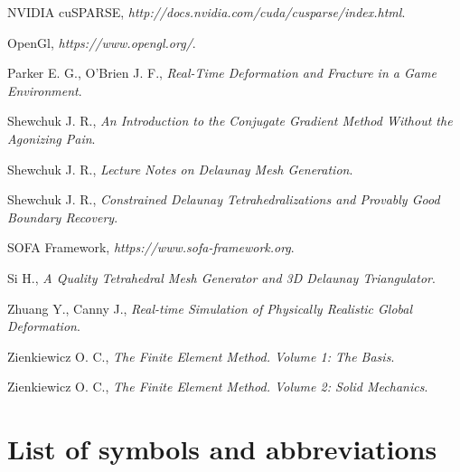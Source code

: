 \documentclass[en]{minipw} %
\begin{document}
\begin{thebibliography}{25}
 NVIDIA cuSPARSE, \emph{http://docs.nvidia.com/cuda/cusparse/index.html}.

 OpenGl, \emph{https://www.opengl.org/}.

 Parker E. G., O'Brien J. F., \emph{Real-Time Deformation and Fracture in a Game Environment}.

 Shewchuk J. R., \emph{An Introduction to the Conjugate Gradient Method Without the Agonizing Pain}.

 Shewchuk J. R., \emph{Lecture Notes on Delaunay Mesh Generation}.

 Shewchuk J. R., \emph{Constrained Delaunay Tetrahedralizations and Provably Good Boundary Recovery}.

 SOFA Framework, \emph{https://www.sofa-framework.org}.

 Si H., \emph{A Quality Tetrahedral Mesh Generator and 3D Delaunay Triangulator}.

 Zhuang Y., Canny J., \emph{Real-time Simulation of Physically Realistic Global Deformation}.

 Zienkiewicz O. C., \emph{The Finite Element Method. Volume 1: The Basis}.

 Zienkiewicz O. C., \emph{The Finite Element Method. Volume 2: Solid Mechanics}.
































\end{thebibliography}

\chapter*{List of symbols and abbreviations}
\end{document}

